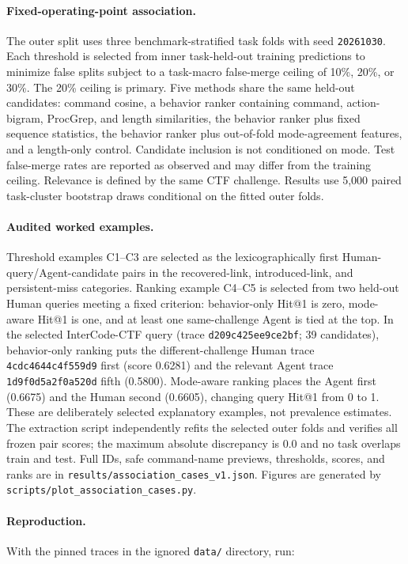 \paragraph{Fixed-operating-point association.} The outer split uses three benchmark-stratified task folds with seed \texttt{20261030}. Each threshold is selected from inner task-held-out training predictions to minimize false splits subject to a task-macro false-merge ceiling of 10\%, 20\%, or 30\%. The 20\% ceiling is primary. Five methods share the same held-out candidates: command cosine, a behavior ranker containing command, action-bigram, ProcGrep, and length similarities, the behavior ranker plus fixed sequence statistics, the behavior ranker plus out-of-fold mode-agreement features, and a length-only control. Candidate inclusion is not conditioned on mode. Test false-merge rates are reported as observed and may differ from the training ceiling. Relevance is defined by the same CTF challenge. Results use 5,000 paired task-cluster bootstrap draws conditional on the fitted outer folds.

\paragraph{Audited worked examples.} Threshold examples C1--C3 are selected as the lexicographically first Human-query/Agent-candidate pairs in the recovered-link, introduced-link, and persistent-miss categories. Ranking example C4--C5 is selected from two held-out Human queries meeting a fixed criterion: behavior-only Hit@1 is zero, mode-aware Hit@1 is one, and at least one same-challenge Agent is tied at the top. In the selected InterCode-CTF query (trace \texttt{d209c425ee9ce2bf}; 39 candidates), behavior-only ranking puts the different-challenge Human trace \texttt{4cdc4644c4f559d9} first (score 0.6281) and the relevant Agent trace \texttt{1d9f0d5a2f0a520d} fifth (0.5800). Mode-aware ranking places the Agent first (0.6675) and the Human second (0.6605), changing query Hit@1 from 0 to 1. These are deliberately selected explanatory examples, not prevalence estimates. The extraction script independently refits the selected outer folds and verifies all frozen pair scores; the maximum absolute discrepancy is 0.0 and no task overlaps train and test. Full IDs, safe command-name previews, thresholds, scores, and ranks are in \texttt{results/association\_cases\_v1.json}. Figures are generated by \texttt{scripts/plot\_association\_cases.py}.

\paragraph{Reproduction.} With the pinned traces in the ignored \texttt{data/} directory, run:

